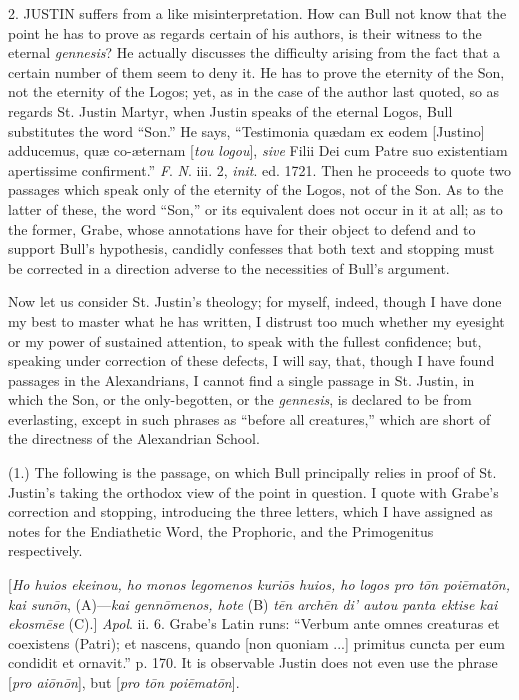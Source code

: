 2. JUSTIN suffers from a like
misinterpretation. How can Bull not know that the point he has to
prove as regards certain of his authors, is their witness to the
eternal \emph{gennesis}? He actually discusses the difficulty arising
from the fact that a certain number of them seem to deny it. He has to
prove the eternity of the Son, not the eternity of the Logos; yet, as
in the case of the author last quoted, so as regards St. Justin
Martyr, when Justin speaks of the eternal Logos, Bull substitutes the
word ``Son.'' He says, ``Testimonia quædam ex eodem [Justino]
adducemus, quæ co-æternam [\emph{tou logou}], \emph{sive} Filii Dei
cum Patre suo existentiam apertissime confirment.'' \emph{F}. \emph{N}.
iii. 2, \emph{init}. ed. 1721. Then he proceeds to quote two passages
which speak only of the eternity of the Logos, not of the Son. As to
the latter of these, the word ``Son,'' or its equivalent
does not occur in it at all; as to the former, Grabe, whose
annotations have for their object to defend and to support Bull's
hypothesis, candidly confesses that both text and stopping must be
corrected in a direction adverse to the necessities of Bull's
argument.

Now let us consider St. Justin's theology; for myself, indeed,
though I have done my best to master what he has written, I distrust
too much whether my eyesight or my power of sustained attention, to
speak with the fullest confidence; but, speaking under correction of
these defects, I will say, that, though I have found passages in the
Alexandrians, I cannot find a single passage in St. Justin, in which
the Son, or the only-begotten, or the \emph{gennesis}, is declared to
be from everlasting, except in such phrases as ``before all
creatures,'' which are short of the directness of the Alexandrian
School.

(1.) The following is the passage, on which Bull principally relies
in proof of St. Justin's taking the orthodox view of the point in
question. I quote with Grabe's correction and stopping, introducing
the three letters, which I have assigned as notes for the Endiathetic
Word, the Prophoric, and the Primogenitus respectively.

[\emph{Ho huios ekeinou, ho monos legomenos kuri\={o}s huios, ho
logos pro t\={o}n poi\={e}mat\={o}n, kai sun\={o}n},
(A)—\emph{kai genn\={o}menos, hote} (B) \emph{t\={e}n arch\={e}n
di' autou panta ektise kai ekosm\={e}se} (C).] \emph{Apol}. ii.
6. Grabe's Latin runs: ``Verbum ante omnes creaturas et coexistens
(Patri); et nascens, quando [non quoniam ...] primitus cuncta per eum
condidit et ornavit.'' p. 170. It is observable Justin does not
even use the phrase [\emph{pro ai\={o}n\={o}n}], but [\emph{pro t\={o}n
poi\={e}mat\={o}n}].

